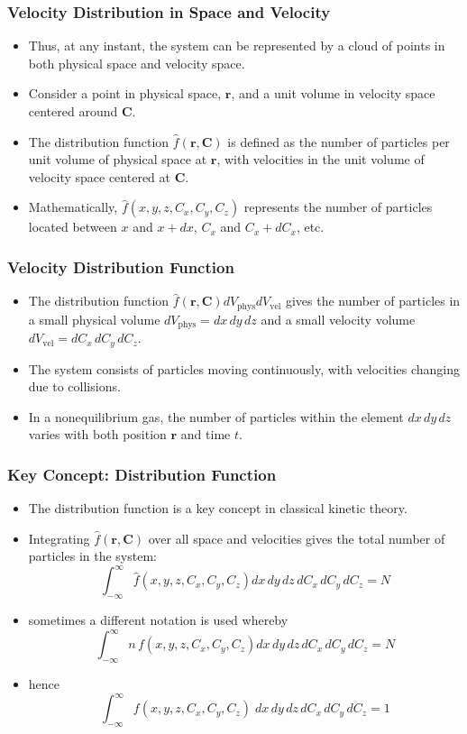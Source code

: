 \documentclass{beamer}
\begin{document}
\begin{frame}
\frametitle{Velocity Distribution in Space and Velocity}
\begin{itemize}
    \item Thus, at any instant, the system can be represented by a cloud of points in both physical space and velocity space.
    \item Consider a point in physical space, $\mathbf{r}$, and a unit volume in velocity space centered around $\mathbf{C}$.
    \item The distribution function $\hat{f}(\mathbf{r}, \mathbf{C})$ is defined as the number of particles per unit volume of physical space at $\mathbf{r}$, with velocities in the unit volume of velocity space centered at $\mathbf{C}$.
    \item Mathematically, $\hat{f}(x, y, z, C_x, C_y, C_z)$ represents the number of particles located between $x$ and $x + dx$, $C_x$ and $C_x + dC_x$, etc.
\end{itemize}
\end{frame}

\begin{frame}
\frametitle{Velocity Distribution Function}
\begin{itemize}
    \item The distribution function $\hat{f}(\mathbf{r}, \mathbf{C}) dV_{\text{phys}} dV_{\text{vel}}$ gives the number of particles in a small physical volume $dV_{\text{phys}} = dx\,dy\,dz$ and a small velocity volume $dV_{\text{vel}} = dC_x\,dC_y\,dC_z$.
    \item The system consists of particles moving continuously, with velocities changing due to collisions.
    \item In a nonequilibrium gas, the number of particles within the element $dx\,dy\,dz$ varies with both position $\mathbf{r}$ and time $t$.
\end{itemize}
\end{frame}

\begin{frame}
\frametitle{Key Concept: Distribution Function}
\begin{itemize}
    \item The distribution function is a key concept in classical kinetic theory.
    \item Integrating $\hat{f}(\mathbf{r}, \mathbf{C})$ over all space and velocities gives the total number of particles in the system:
    \[
    \int_{-\infty}^{\infty}  \hat{f}(x, y, z, C_x, C_y, C_z) dx\,dy\,dz\,dC_x\,dC_y\,dC_z = N
    \]
    \item sometimes a different notation is used whereby
        \[
    \int_{-\infty}^{\infty} n \, f(x, y, z, C_x, C_y, C_z) dx\,dy\,dz\,dC_x\,dC_y\,dC_z = N
    \]
    \item hence
            \[
    \int_{-\infty}^{\infty}  f(x, y, z, C_x, C_y, C_z) \; dx\,dy\,dz\,dC_x\,dC_y\,dC_z = 1
    \]
\end{itemize}
\end{frame}
\end{document}
